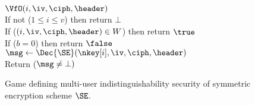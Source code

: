 \begin{figure} [t]
{
\underline{$\VfO(i,\iv,\ciph,\header)$}\\[2pt]
If not ($1\leq i\leq v$) then return $\bot$ \\
If ($(i,\iv,\ciph,\header) \in W$) then return $\true$ \\ 
If ($b=0$) then return $\false$ \\
$\msg \gets \Dec{\SE}(\nkey[i],\iv,\ciph,\header)$ \\
Return ($\msg\neq\bot)$ \medskip


}
\vspace{-2ex}
\caption{Game defining multi-user indistinguishability security of symmetric encryption scheme $\SE$.}
\label{fig-se-mu-ind}
\hrulefill
\end{figure}

